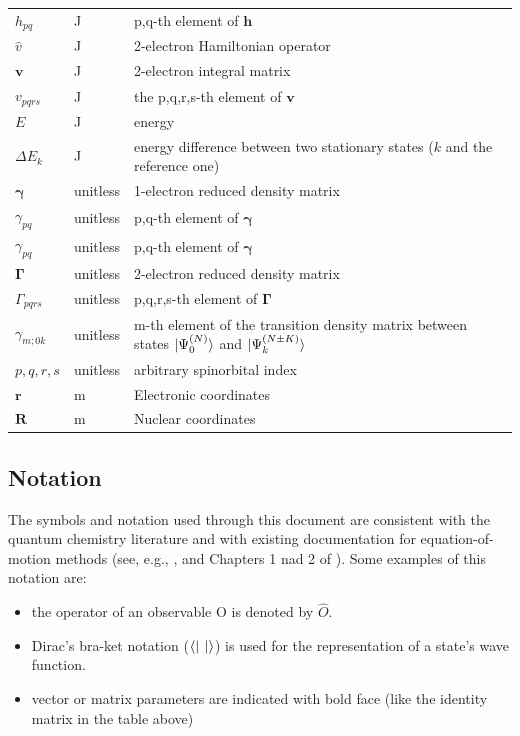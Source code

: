 \documentclass[12pt]{article}
\begin{document}
\begin{longtable*}{l l p{12cm}}
$h_{pq}$ & \si{\joule} & p,q-th element of $\mathbf{h}$\\
$\hat{v}$ & \si{\joule} & 2-electron Hamiltonian operator\\
$\mathbf{v}$ & \si{\joule} & 2-electron integral matrix\\
$v_{pqrs}$ & \si{\joule} & the p,q,r,s-th element of $\mathbf{v}$\\
$E$ & \si{\joule} & energy\\
$\Delta E_{k}$ & \si{\joule} & energy difference between two stationary 
states ($k$ and the reference one)\\
$\boldsymbol{\gamma}$ & unitless& 1-electron reduced density matrix\\
$\gamma_{pq}$ & unitless& p,q-th element of $\boldsymbol{\gamma}$\\
$\gamma_{pq}$ & unitless& p,q-th element of $\boldsymbol{\gamma}$\\
$\boldsymbol{\Gamma}$ & unitless& 2-electron reduced density matrix\\
$\Gamma_{pqrs}$ & unitless& p,q,r,s-th element of $\boldsymbol{\Gamma}$\\
$\gamma_{m;0k}$ & unitless& m-th element of the transition density matrix 
between states $\ket{\Psi^{(N)}_0}$ and $\ket{\Psi^{(N \pm K)}_{k}}$\\
$p,q,r,s$ & unitless & arbitrary spinorbital index\\
$\mathbf{r}$ & \si{\metre} & Electronic coordinates\\
$\mathbf{R}$ & \si{\metre} & Nuclear coordinates\\
\bottomrule
\end{longtable*}
\subsection{Notation}
The symbols and notation used through this document are consistent with the 
quantum chemistry literature and with existing documentation for 
equation-of-motion methods (see, e.g., \cite{Pernal2018}, \cite{McKoy1977} and 
Chapters 1 nad 2 of \cite{szabo-ostlund}). Some examples of this notation are: 
\begin{itemize}
\item the operator of an observable O is denoted by $\hat{O}$.
\item Dirac's bra-ket notation ($\bra{}$ $\ket{}$) is used for the 
representation of a state's wave function.
\item vector or matrix parameters are indicated with bold face (like the 
identity matrix in the table above)
\end{itemize}
\end{document}
